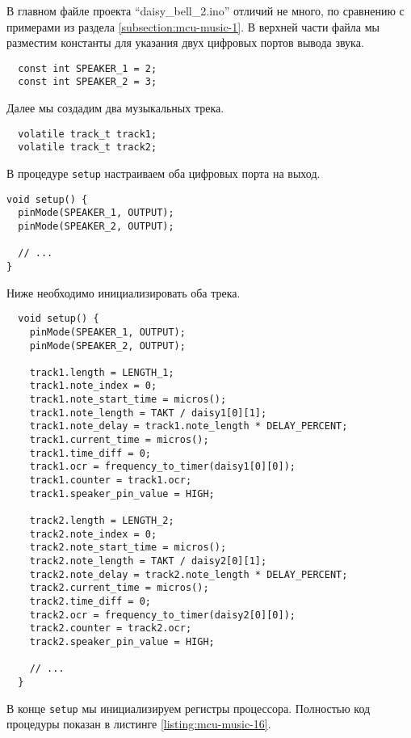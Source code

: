 \documentclass[../sparc.tex]{subfiles}
\begin{document}
В главном файле проекта ``daisy\_bell\_2.ino'' отличий не много, по сравнению с
примерами из раздела \ref{subsection:mcu-music-1}.  В верхней части файла мы
разместим константы для указания двух цифровых портов вывода звука.

\begin{verbatim}
  const int SPEAKER_1 = 2;
  const int SPEAKER_2 = 3;
\end{verbatim}

Далее мы создадим два музыкальных трека.

\begin{verbatim}
  volatile track_t track1;
  volatile track_t track2;
\end{verbatim}

В процедуре \texttt{setup} настраиваем оба цифровых порта на выход.

\begin{verbatim}
void setup() {
  pinMode(SPEAKER_1, OUTPUT);
  pinMode(SPEAKER_2, OUTPUT);

  // ...
}
\end{verbatim}

Ниже необходимо инициализировать оба трека.

\begin{verbatim}
  void setup() {
    pinMode(SPEAKER_1, OUTPUT);
    pinMode(SPEAKER_2, OUTPUT);

    track1.length = LENGTH_1;
    track1.note_index = 0;
    track1.note_start_time = micros();
    track1.note_length = TAKT / daisy1[0][1];
    track1.note_delay = track1.note_length * DELAY_PERCENT;
    track1.current_time = micros();
    track1.time_diff = 0;
    track1.ocr = frequency_to_timer(daisy1[0][0]);
    track1.counter = track1.ocr;
    track1.speaker_pin_value = HIGH;

    track2.length = LENGTH_2;
    track2.note_index = 0;
    track2.note_start_time = micros();
    track2.note_length = TAKT / daisy2[0][1];
    track2.note_delay = track2.note_length * DELAY_PERCENT;
    track2.current_time = micros();
    track2.time_diff = 0;
    track2.ocr = frequency_to_timer(daisy2[0][0]);
    track2.counter = track2.ocr;
    track2.speaker_pin_value = HIGH;

    // ...
  }
\end{verbatim}

В конце \texttt{setup} мы инициализируем регистры процессора.
Полностью код процедуры показан в листинге \ref{listing:mcu-music-16}.
\end{document}
